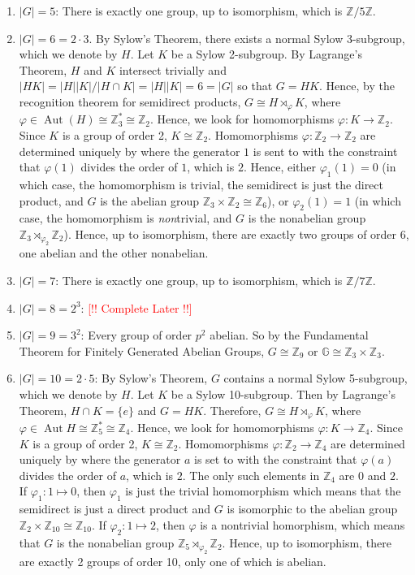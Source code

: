 \documentclass{article}
\begin{document}
\begin{enumerate}[itemsep =-2pt,label = (\arabic{*})]
	\item $|G| = 5$: There is exactly one group, up to isomorphism, which is $\mathbb{Z}/5\mathbb{Z}$. 
	\item $|G| = 6 = 2 \cdot 3$. By Sylow's Theorem, there exists a normal Sylow 3-subgroup, which we denote by $H$. Let $K$ be a Sylow 2-subgroup. By Lagrange's Theorem, $H$ and $K$ intersect trivially and $|HK| = |H||K|/|H \cap K| = |H||K| = 6 = |G|$ so that $G = HK$. Hence, by the recognition theorem for semidirect products, $G \cong H \rtimes_{\varphi} K$, where $\varphi \in \operatorname{Aut}(H) \cong \mathbb{Z}_{3}^{\ast} \cong \mathbb{Z}_{2}$. Hence, we look for homomorphisms $\varphi: K \to \mathbb{Z}_{2}$. Since $K$ is a group of order 2, $K\cong \mathbb{Z}_{2}$. Homomorphisms $\varphi: \mathbb{Z}_{2} \to \mathbb{Z}_{2}$ are determined uniquely by where the generator $1$ is sent to with the constraint that $\varphi(1)$ divides the order of $1$, which is $2$. Hence, either $\varphi_{1}(1) = 0$ (in which case, the homomorphism is trivial, the semidirect is just the direct product, and $G$ is the abelian group $\mathbb{Z}_{3} \times \mathbb{Z}_{2} \cong \mathbb{Z}_{6}$), or $\varphi_{2}(1) = 1$ (in which case, the homomorphism is \textit{non}trivial, and $G$ is the nonabelian group $\mathbb{Z}_{3} \rtimes_{\varphi_{2}}\mathbb{Z}_{2}$). Hence, up to isomorphism, there are exactly two groups of order 6, one abelian and the other nonabelian. 
	\item $|G| = 7$: There is exactly one group, up to isomorphism, which is $\mathbb{Z}/7\mathbb{Z}$. 
	\item $|G| = 8 = 2^{3}$: \textcolor{red}{[!! Complete Later !!]}
	\item $|G| = 9 = 3^{2}$: Every group of order $p^{2}$ abelian. So by the Fundamental Theorem for Finitely Generated Abelian Groups, $G \cong\mathbb{Z}_{9}$ or $\mathbb{G} \cong\mathbb{Z}_{3} \times \mathbb{Z}_{3}$. 
	\item $|G| = 10 = 2 \cdot 5$: By Sylow's Theorem, $G$ contains a normal Sylow 5-subgroup, which we denote by $H$. Let $K$ be a Sylow 10-subgroup. Then by Lagrange's Theorem, $H \cap K = \{e\}$ and $G = HK$. Therefore, $G \cong H \rtimes_{\varphi} K$, where $\varphi \in \operatorname{Aut}{H} \cong \mathbb{Z}_{5}^{\ast} \cong \mathbb{Z}_{4}$. Hence, we look for homomorphisms $\varphi: K \to \mathbb{Z}_{4}$. Since $K$ is a group of order 2, $K \cong \mathbb{Z}_{2}$. Homomorphisms $\varphi: \mathbb{Z}_{2} \to \mathbb{Z}_{4}$ are determined uniquely by where the generator $a$ is set to with the constraint that $\varphi(a)$ divides the order of $a$, which is $2$. The only such elements in $\mathbb{Z}_{4}$ are $0$ and $2$. If $\varphi_{1}: 1 \mapsto 0$, then $\varphi_{1}$ is just the trivial homomorphism which means that the semidirect is just a direct product and $G$ is isomorphic to the abelian group $\mathbb{Z}_{2} \times \mathbb{Z}_{10} \cong \mathbb{Z}_{10}$. If $\varphi_{2}: 1 \mapsto 2$, then $\varphi$ is a nontrivial homorphism, which means that $G$ is the nonabelian group $\mathbb{Z}_{5} \rtimes_{\varphi_{2}} \mathbb{Z}_{2}$. Hence, up to isomorphism, there are exactly 2 groups of order 10, only one of which is abelian. 

\end{enumerate}
\end{document}
